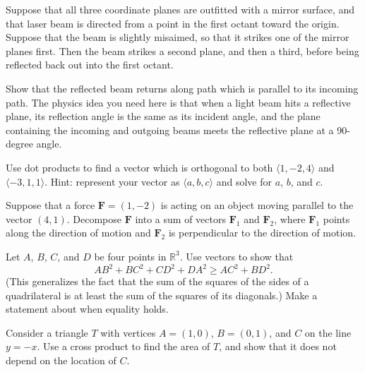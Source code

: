 \documentclass[svgnames]{watsonbook}
\begin{document}
\begin{aexercise}
  Suppose that all three coordinate planes are outfitted with a mirror
  surface, and that laser beam is directed from a point in the first
  octant toward the origin. Suppose that the beam is slightly
  misaimed, so that it strikes one of the mirror planes first. Then
  the beam strikes a second plane, and then a third, before being
  reflected back out into the first octant.

  Show that the reflected beam returns along  path which is parallel
  to its incoming path. The physics idea you need here is that when  a
  light beam hits a reflective plane, its reflection angle is the same
  as its incident angle, and the plane containing the incoming and
  outgoing beams meets the reflective plane at a 90-degree angle. 
\end{aexercise}


\begin{aexercise}
  Use dot products to find a vector which is orthogonal to both
  $\langle 1, -2, 4 \rangle$ and $\langle -3, 1, 1 \rangle$. Hint:
  represent your vector as $\langle a, b, c \rangle$ and solve for
  $a$, $b$, and $c$. 
\end{aexercise}

\begin{aexercise}
Suppose that a force $\mathbf{F}=(1,-2)$ is acting on an object moving
parallel to the vector $(4,1)$. Decompose $\mathbf{F}$ into a sum of
vectors $\mathbf{F}_1$ and $\mathbf{F}_2$, where $\mathbf{F}_1$ points
along the direction of motion and $\mathbf{F}_2$ is perpendicular to
the direction of motion.
\end{aexercise}

\begin{aexercise}%
  Let $A$, $B$, $C$, and $D$ be four points in $\mathbb{R}^3$. Use vectors to show that 
\[
AB^2 +BC^2 + CD^2 + DA^2 \geq AC^2 + BD^2. 
\]
(This generalizes the fact that the sum of the squares of the sides of
a quadrilateral is at least the sum of the squares of its diagonals.)
Make a statement about when equality holds.
\end{aexercise}


\begin{aexercise}
  Consider a triangle $T$ with vertices $A=(1,0)$, $B=(0,1)$, and $C$ on the line $y=-x$. Use a cross product to find the area of $T$, and show that it does not depend on the location of $C$. 
\end{aexercise}
\end{document}
